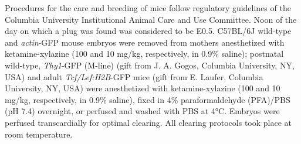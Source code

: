 Procedures for the care and breeding of mice follow regulatory guidelines of the Columbia University Institutional Animal Care and Use Committee.
Noon of the day on which a plug was found was considered to be E0.5.
C57BL/6J wild-type and \emph{actin}-GFP mouse embryos were removed from mothers anesthetized with ketamine-xylazine (100 and 10 mg/kg, respectively, in 0.9\% saline); postnatal wild-type, \emph{Thy1}-GFP (M-line) (gift from J. A. Gogos, Columbia University, NY, USA) and adult \emph{Tcf/Lef:H2B}-GFP mice (gift from E. Laufer, Columbia University, NY, USA) were anesthetized with ketamine-xylazine (100 and 10 mg/kg, respectively, in 0.9\% saline), fixed in 4\% paraformaldehyde (PFA)/PBS (pH 7.4) overnight, or perfused and washed with PBS at 4°C.
Embryos were perfused transcardially for optimal clearing.
All clearing protocols took place at room temperature.